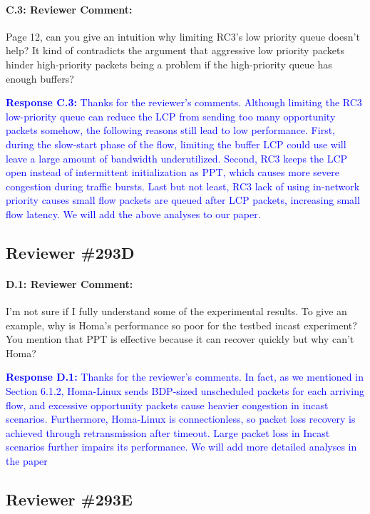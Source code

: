 \documentclass[12pt,one-column]{article}
\begin{document}
{\it \paragraph{C.3: Reviewer Comment:} Page 12, can you give an intuition why limiting RC3’s low priority queue doesn’t help? It kind of contradicts the argument that aggressive low priority packets hinder high-priority packets being a problem if the high-priority queue has enough buffers?}


\noindent\textcolor{blue}{\textbf{Response C.3:}
Thanks for the reviewer’s comments. 
Although limiting the RC3 low-priority queue can reduce the LCP from sending too many opportunity packets somehow, the following reasons still lead to low performance.
First, during the slow-start phase of the flow, limiting the buffer LCP could use will leave a large amount of bandwidth underutilized.
Second, RC3 keeps the LCP open instead of intermittent initialization as PPT, which causes more severe congestion during traffic bursts.
Last but not least, RC3 lack of using in-network priority causes small flow packets are queued after LCP packets, increasing small flow latency.
We will add the above analyses to our paper.
}


\subsection{Reviewer \#293D}
{\it \paragraph{D.1: Reviewer Comment:} I'm not sure if I fully understand some of the experimental results. To give an example, why is Homa's performance so poor for the testbed incast experiment? You mention that PPT is effective because it can recover quickly but why can't Homa?}


\noindent\textcolor{blue}{\textbf{Response D.1:}
Thanks for the reviewer’s comments. 
In fact, as we mentioned in Section 6.1.2, Homa-Linux sends BDP-sized unscheduled packets for each arriving flow, and excessive opportunity packets cause heavier congestion in incast scenarios.
Furthermore, Homa-Linux is connectionless, so packet loss recovery is achieved through retransmission after timeout.
Large packet loss in Incast scenarios further impairs its performance.
We will add more detailed analyses in the paper
}

\subsection{Reviewer \#293E}
\end{document}
